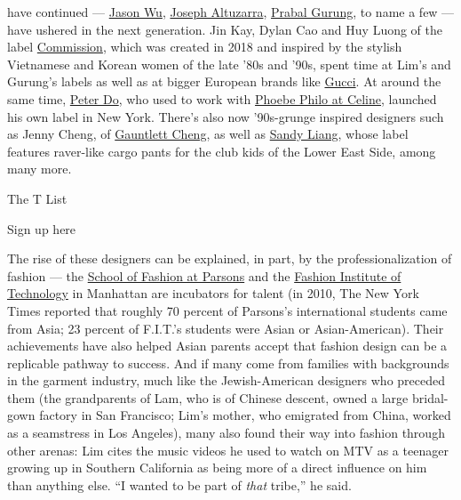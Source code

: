 have continued ---
\href{https://www.nytimes3xbfgragh.onion/2019/09/08/t-magazine/jason-wu-newspaper-dress.html}{Jason
Wu},
\href{https://www.nytimes3xbfgragh.onion/2017/10/02/t-magazine/joseph-altuzarra-paris-fashion-week.html}{Joseph
Altuzarra},
\href{https://www.nytimes3xbfgragh.onion/2019/11/12/t-magazine/prabal-gurung-book-photos.html}{Prabal
Gurung}, to name a few --- have ushered in the next generation. Jin Kay,
Dylan Cao and Huy Luong of the label
\href{https://www.nytimes3xbfgragh.onion/2018/12/26/t-magazine/best-new-fashion-brands.html}{Commission},
which was created in 2018 and inspired by the stylish Vietnamese and
Korean women of the late '80s and '90s, spent time at Lim's and Gurung's
labels as well as at bigger European brands like
\href{https://www.nytimes3xbfgragh.onion/2018/10/15/t-magazine/alessandro-michele-gucci-interview.html}{Gucci}.
At around the same time, \href{https://peterdo.net/}{Peter Do}, who used
to work with
\href{https://www.nytimes3xbfgragh.onion/2018/03/01/t-magazine/fashion/celine-phoebe-philo-era-stories-sofia-coppola-stella-tennant.html}{Phoebe
Philo at Celine}, launched his own label in New York. There's also now
'90s-grunge inspired designers such as Jenny Cheng, of
\href{https://www.nytimes3xbfgragh.onion/2017/02/17/t-magazine/fashion/new-york-fashion-week-top-10-moments.html}{Gauntlett
Cheng}, as well as
\href{https://www.nytimes3xbfgragh.onion/2019/02/12/fashion/sandy-liang-fleece.html}{Sandy
Liang}, whose label features raver-like cargo pants for the club kids of
the Lower East Side, among many more.

The T List \textbar{}

Sign up here

The rise of these designers can be explained, in part, by the
professionalization of fashion --- the
\href{https://www.newschool.edu/parsons/fashion-school/}{School of
Fashion at Parsons} and the
\href{https://www.nytimes3xbfgragh.onion/topic/organization/fashion-institute-of-technology}{Fashion
Institute of Technology} in Manhattan are incubators for talent (in
2010, The New York Times reported that roughly 70 percent of Parsons's
international students came from Asia; 23 percent of F.I.T.'s students
were Asian or Asian-American). Their achievements have also helped Asian
parents accept that fashion design can be a replicable pathway to
success. And if many come from families with backgrounds in the garment
industry, much like the Jewish-American designers who preceded them (the
grandparents of Lam, who is of Chinese descent, owned a large
bridal-gown factory in San Francisco; Lim's mother, who emigrated from
China, worked as a seamstress in Los Angeles), many also found their way
into fashion through other arenas: Lim cites the music videos he used to
watch on MTV as a teenager growing up in Southern California as being
more of a direct influence on him than anything else. ``I wanted to be
part of \emph{that} tribe,'' he said.

